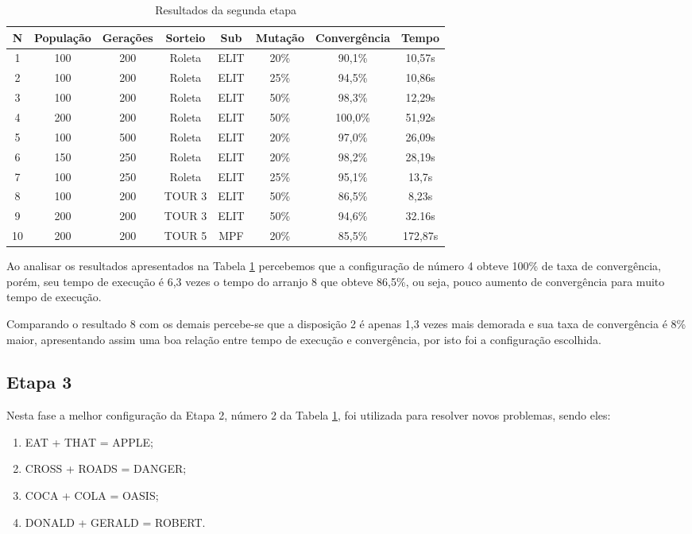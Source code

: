 \documentclass[a4paper, 12pt]{article}
\begin{document}
  \begin{table}[h]
    \centering
    \begin{tabular}{|c|c|c|c|c|c|c|c|}
      \hline
      N & População & Gerações & Sorteio & Sub & Mutação & Convergência & Tempo  \\
      \hline
      1 & 100 & 200 & Roleta & ELIT & 20\% & 90,1\% & 10,57s \\
      \hline
      2 & 100 & 200 & Roleta & ELIT & 25\% & 94,5\% & 10,86s \\
      \hline
      3 & 100 & 200 & Roleta & ELIT & 50\% & 98,3\% & 12,29s \\
      \hline
      4 & 200 & 200 & Roleta & ELIT & 50\% & 100,0\% & 51,92s \\
      \hline
      5 & 100 & 500 & Roleta & ELIT & 20\% & 97,0\% & 26,09s \\
      \hline
      6 & 150 & 250 & Roleta & ELIT & 20\% & 98,2\% & 28,19s \\
      \hline
      7 & 100 & 250 & Roleta & ELIT & 25\% & 95,1\% & 13,7s \\
      \hline
      8 & 100 & 200 & TOUR 3 & ELIT & 50\% & 86,5\% & 8,23s \\
      \hline
      9 & 200 & 200 & TOUR 3 & ELIT & 50\% & 94,6\% & 32.16s \\
      \hline
      10 & 200 & 200 & TOUR 5 & MPF & 20\% & 85,5\% & 172,87s \\
      \hline
    \end{tabular}
    \caption{Resultados da segunda etapa}
    \label{tab:etapa2}
  \end{table}

  Ao analisar os resultados apresentados na Tabela \ref{tab:etapa2} percebemos
  que a configuração de número 4 obteve 100\% de taxa de convergência, porém,
  seu tempo de execução é 6,3 vezes o tempo do arranjo 8 que obteve 86,5\%, ou seja,
  pouco aumento de convergência para muito tempo de execução.

  Comparando o resultado 8 com os demais percebe-se que a disposição 2 é apenas
  1,3 vezes mais demorada e sua taxa de convergência é 8\% maior, apresentando assim
  uma boa relação entre tempo de execução e convergência, por isto foi a configuração
  escolhida.
  \subsection{Etapa 3}
  Nesta fase a melhor configuração da Etapa 2, número 2 da Tabela \ref{tab:etapa2},
  foi utilizada para resolver novos problemas, sendo eles:
  \begin{enumerate}
  \item EAT + THAT = APPLE;
  \item CROSS + ROADS = DANGER;
  \item COCA + COLA = OASIS;
  \item DONALD + GERALD = ROBERT.
  \end{enumerate}
\end{document}
